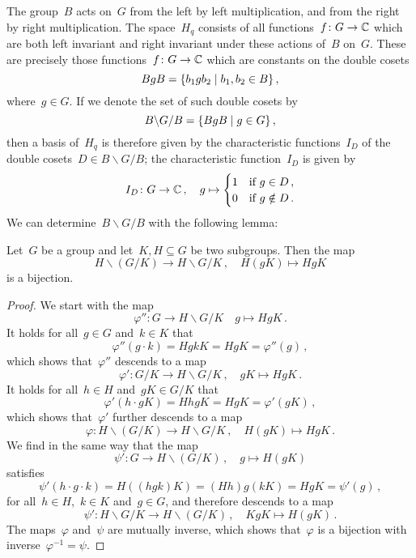 The group~$B$ acts on~$G$ from the left by left multiplication, and from the right by right multiplication.
The space~$H_q$ consists of all functions~$f \colon G \to \mathbb{C}$ which are both left invariant and right invariant under these actions of~$B$ on~$G$.
These are precisely those functions~$f \colon G \to \mathbb{C}$ which are constants on the double cosets
\[
    BgB
  = \{
      b_1 g b_2
    \suchthat
      b_1, b_2 \in B
    \} \,,
\]
where~$g \in G$.
If we denote the set of such double cosets by
\[
    B \backslash G / B
  = \{
      B g B
    \suchthat
      g \in G
    \} \,,
\]
then a basis of~$H_q$ is therefore given by the characteristic functions~$I_D$ of the double cosets~$D \in B \backslash G / B$;
the characteristic function~$I_D$ is given by
\[
          I_D
  \colon  G
  \to     \mathbb{C} \,,
  \quad   g
  \mapsto \begin{cases}
            1 & \text{if~$g \in D$} \,, \\
            0 & \text{if~$g \notin D$}  \,.
          \end{cases}
\]
We can determine~$B \backslash G / B$ with the following lemma:

\begin{lemma}
  \label{double cosets}
  Let~$G$ be a group and let~$K, H \subseteq G$ be two subgroups.
  Then the map
  \[
            H \backslash (G / K)
    \to     H \backslash G / K \,,
    \quad   H(gK)
    \mapsto HgK
  \]
  is a {\welldef} bijection.
\end{lemma}

\begin{proof}
  We start with the {\welldef} map
  \[
            \varphi''
    \colon  G
    \to     H \backslash G / K
    \quad   g
    \mapsto H g K \,.
  \]
  It holds for all~$g \in G$ and~$k \in K$ that
  \[
      \varphi''(g \cdot k)
    = H g k K
    = H g K
    = \varphi''(g) \,,
  \]
  which shows that~$\varphi''$ descends to a {\welldef} map
  \[
            \varphi'
    \colon  G / K
    \to     H \backslash G / K  \,,
    \quad   gK
    \mapsto H g K \,.
  \]
  It holds for all~$h \in H$ and~$gK \in G/K$ that
  \[
      \varphi'(h \cdot gK)
    = H hg K
    = H g K
    = \varphi'(gK) \,,
  \]
  which shows that~$\varphi'$ further descends to a {\welldef} map
  \[
            \varphi
    \colon  H \backslash (G / K)
    \to     H \backslash G / K  \,,
    \quad   H(gK)
    \mapsto H g K \,.
  \]
  We find in the same way that the {\welldef} map
  \[
            \psi'
    \colon  G
    \to     H \backslash (G / K) \,,
    \quad   g
    \mapsto H(gK)
  \]
  satisfies
  \[
      \psi'(h \cdot g \cdot k)
    = H((hgk)K)
    = (Hh)g(kK)
    = HgK
    = \psi'(g)  \,,
  \]
  for all~$h \in H$,~$k \in K$ and~$g \in G$, and therefore descends to a {\welldef} map
  \[
            \psi'
    \colon  H \backslash G / K
    \to     H \backslash (G / K) \,,
    \quad   KgK
    \mapsto H(gK) \,.
  \]
  The maps~$\varphi$ and~$\psi$ are mutually inverse, which shows that~$\varphi$ is a bijection with inverse~$\varphi^{-1} = \psi$.
\end{proof}



